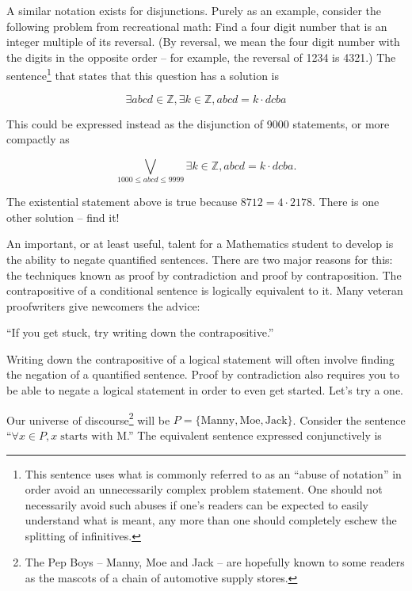 A similar notation exists for disjunctions.  Purely as an example, consider
the following problem from recreational math: Find a four digit number that
is an integer multiple of its reversal.  (By reversal, we mean the four
digit number with the digits in the opposite order -- for example, the
reversal of 1234 is 4321.)  The sentence\footnote{This sentence uses what %
is commonly referred to as an ``abuse of notation'' in order avoid an %
unnecessarily complex problem statement.  One should not necessarily %
avoid such abuses if one's readers can be expected to easily understand %
what is meant, any more than one should completely eschew the splitting %
of infinitives.}
that states that this question has a solution is

\[
\exists abcd \in {\mathbb Z},  \exists k \in {\mathbb Z}, abcd = k\cdot dcba
\]

This could be expressed instead as the disjunction of 9000 statements, or more 
compactly as

\[
\bigvee_{1000\leq abcd \leq 9999}  \exists k \in {\mathbb Z}, abcd = k\cdot dcba.
\]

\begin{exer} The existential statement above is true because $8712 = 4\cdot 2178$.
There is one other solution -- find it!
\end{exer}

An important, or at least useful, talent for a Mathematics student to develop
is the ability to negate quantified sentences.  There are two major reasons for this:
the techniques known as proof by contradiction and proof by contraposition. 
The contrapositive of a conditional sentence is logically
equivalent to it.   Many veteran proofwriters give newcomers the advice:

``If you get stuck, try writing down the contrapositive.''

Writing down the contrapositive of a logical statement will often involve finding the
negation of a quantified sentence.  Proof by contradiction also requires you to be able to
negate a logical statement in order to even get started.  Let's try a one.

Our universe of discourse\footnote{The Pep Boys -- Manny, Moe and %
Jack -- are hopefully known to some readers as the mascots of a chain %
of automotive supply stores.} 
will be $P = \{ \mbox{Manny}, \mbox{Moe}, \mbox{Jack} \}$.  
Consider the sentence 
``$\forall x \in P, x\; \mbox{starts with M}$.''   The equivalent sentence
expressed conjunctively is 

